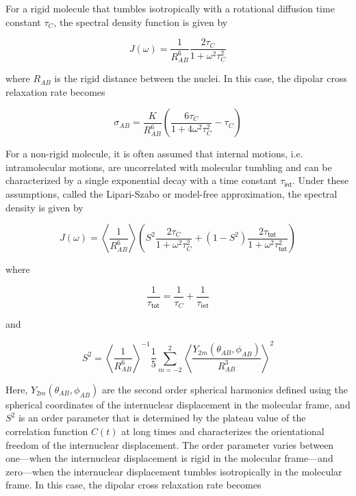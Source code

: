 \documentclass[9pt,review]{livecoms}
\begin{document}
For a rigid molecule that tumbles isotropically with a rotational diffusion time constant $\tau_C$, the spectral density function is given by

\begin{equation}
\label{eqn:noe_rigid_spectral_density}
J(\omega) = \frac {1} {R_{AB}^6} \frac {2 \tau_C} {1 + \omega^2 \tau_C^2}
\end{equation}

\noindent where $R_{AB}$ is the rigid distance between the nuclei. In this case, the dipolar cross relaxation rate becomes

\begin{equation}
\label{eqn:noe_rigid_cross_relaxation}
\sigma_{AB} = \frac {K} {R_{AB}^6} \left( \frac {6 \tau_C} {1 + 4 \omega^2 \tau_C^2} - \tau_C \right)
\end{equation}

For a non-rigid molecule, it is often assumed that internal motions, i.e. intramolecular motions, are uncorrelated with molecular tumbling and can be characterized by a single exponential decay with a time constant $\tau_{\mathsf{int}}$.
Under these assumptions, called the Lipari-Szabo or model-free approximation, the spectral density is given by

\begin{equation}
\label{eqn:ls_spectral_density}
J(\omega) = \left \langle \frac {1} {R_{AB}^6} \right \rangle \left( S^2 \frac {2 \tau_C} {1 + \omega^2 \tau_C^2} + \left( 1 - S^2 \right) \frac {2 \tau_{\mathsf{tot}}} {1 + \omega^2 \tau_{\mathsf{tot}}^2} \right)
\end{equation}

\noindent where

\begin{equation}
\label{eqn:ls_total_tumbling}
\frac {1} {\tau_{\mathsf{tot}}} = \frac {1} {\tau_C} + \frac {1} {\tau_{\mathsf{int}}}
\end{equation}

\noindent and

\begin{equation}
\label{eqn:ls_order_parameter}
S^2 = \left \langle \frac {1} {R_{AB}^6} \right \rangle^{-1} \frac {1} {5} \sum_{m=-2}^2 \left \langle \frac {Y_{2m}(\theta_{AB}, \phi_{AB})} {R_{AB}^3} \right \rangle^2
\end{equation}

\noindent Here, $Y_{2m}(\theta_{AB}, \phi_{AB})$ are the second order spherical harmonics defined using the spherical coordinates of the internuclear displacement in the molecular frame, and $S^2$ is an order parameter that is determined by the plateau value of the correlation function $C(t)$ at long times and characterizes the orientational freedom of the internuclear displacement.
The order parameter varies between one---when the internuclear displacement is rigid in the molecular frame---and zero---when the internuclear displacement tumbles isotropically in the molecular frame.
In this case, the dipolar cross relaxation rate becomes
\end{document}
